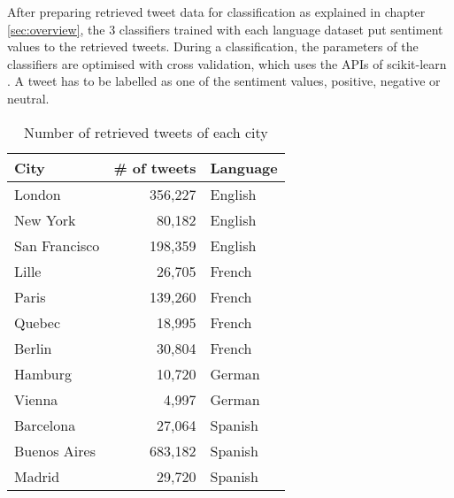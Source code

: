 \documentclass[twocolumn]{article}
\begin{document}
After preparing retrieved tweet data for classification as explained in chapter \ref{sec:overview}, the 3 classifiers trained with each language dataset put sentiment values to the retrieved tweets.
During a classification, the parameters of the classifiers are optimised with cross validation, which uses the APIs of scikit-learn \cite{scikit}.
A tweet has to be labelled as one of the sentiment values, positive, negative or neutral.

\begin{table}[ht]
	\caption{Number of retrieved tweets of each city}
	\begin{tabular}{|l|r|l|} \hline
	City&\# of tweets&Language\\ \hline \hline
	London  & 356,227& English\\ \hline
	New York  & 80,182  & English\\ \hline
	San Francisco & 198,359  & English\\ \hline
	Lille & 26,705  & French\\ \hline
	Paris & 139,260 & French\\ \hline
	Quebec & 18,995 & French\\ \hline
	Berlin & 30,804 & French\\ \hline
	Hamburg & 10,720 & German\\ \hline
	Vienna & 4,997  & German\\ \hline
	Barcelona&27,064 & Spanish\\ \hline
	Buenos Aires&683,182  & Spanish\\ \hline
	Madrid& 29,720 & Spanish\\ \hline
	\end{tabular}
	\label{tab:cities}
\end{table}

\vspace{-6mm}
\end{document}
